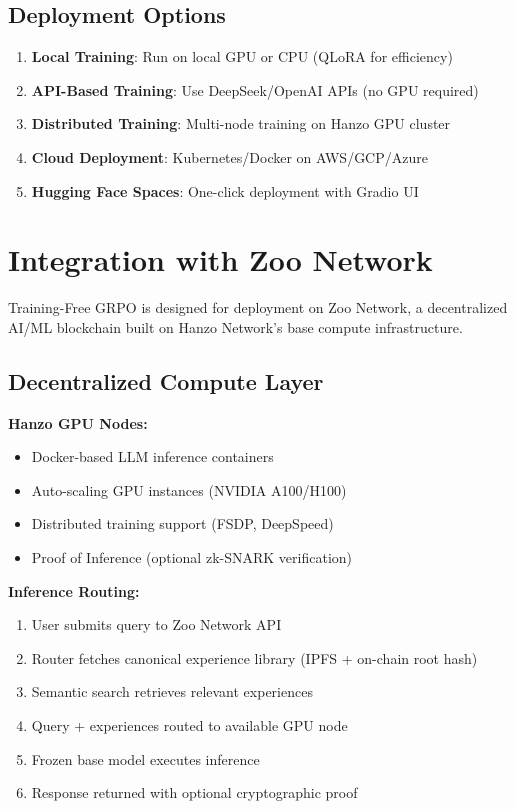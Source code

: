 \documentclass[11pt,a4paper]{article}
\begin{document}
\subsection{Deployment Options}

\begin{enumerate}
    \item \textbf{Local Training}: Run on local GPU or CPU (QLoRA for efficiency)
    \item \textbf{API-Based Training}: Use DeepSeek/OpenAI APIs (no GPU required)
    \item \textbf{Distributed Training}: Multi-node training on Hanzo GPU cluster
    \item \textbf{Cloud Deployment}: Kubernetes/Docker on AWS/GCP/Azure
    \item \textbf{Hugging Face Spaces}: One-click deployment with Gradio UI
\end{enumerate}

\section{Integration with Zoo Network}
\label{sec:governance}

Training-Free GRPO is designed for deployment on Zoo Network, a decentralized AI/ML blockchain built on Hanzo Network's base compute infrastructure.

\subsection{Decentralized Compute Layer}

\textbf{Hanzo GPU Nodes:}
\begin{itemize}
    \item Docker-based LLM inference containers
    \item Auto-scaling GPU instances (NVIDIA A100/H100)
    \item Distributed training support (FSDP, DeepSpeed)
    \item Proof of Inference (optional zk-SNARK verification)
\end{itemize}

\textbf{Inference Routing:}
\begin{enumerate}
    \item User submits query to Zoo Network API
    \item Router fetches canonical experience library (IPFS + on-chain root hash)
    \item Semantic search retrieves relevant experiences
    \item Query + experiences routed to available GPU node
    \item Frozen base model executes inference
    \item Response returned with optional cryptographic proof
\end{enumerate}
\end{document}
